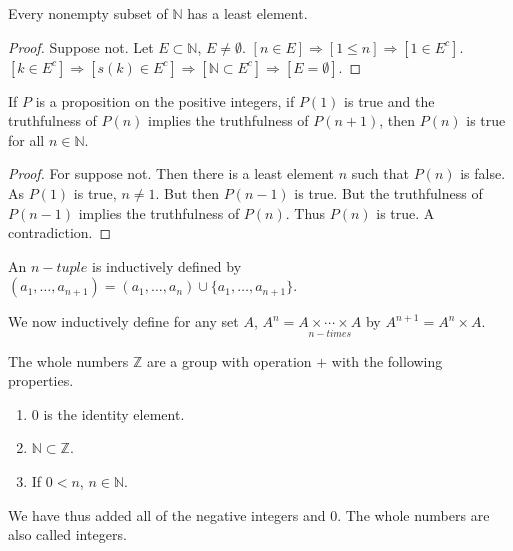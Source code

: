 \documentclass[crop=false,class=book,oneside]{standalone}
\begin{document}
            \begin{theorem}
            Every nonempty subset of $\mathbb{N}$ has a least element.
            \end{theorem}
            \begin{proof}
            Suppose not. Let $E\subset \mathbb{N}$, $E\ne\emptyset$. $[n\in E]\Rightarrow [1\leq n]\Rightarrow [1\in E^c]$. $[k\in E^c]\Rightarrow [s(k)\in E^c]\Rightarrow [\mathbb{N} \subset E^c]\Rightarrow [E = \emptyset]$.
            \end{proof}
            \begin{theorem}
            If $P$ is a proposition on the positive integers, if $P(1)$ is true and the truthfulness of $P(n)$ implies the truthfulness of $P(n+1)$, then $P(n)$ is true for all $n\in \mathbb{N}$.
            \end{theorem}
            \begin{proof}
            For suppose not. Then there is a least element $n$ such that $P(n)$ is false. As $P(1)$ is true, $n\ne 1$. But then $P(n-1)$ is true. But the truthfulness of $P(n-1)$ implies the truthfulness of $P(n)$. Thus $P(n)$ is true. A contradiction.
            \end{proof}
            \begin{definition}
            An $n-tuple$ is inductively defined by $(a_1,\hdots,a_{n+1}) = (a_1,\hdots, a_n)\cup \{a_1,\hdots,a_{n+1}\}$.
            \end{definition}
            \begin{definition}
            We now inductively define for any set $A$, $A^{n} = \underset{n-times}{A\times \cdots \times A}$ by $A^{n+1} = A^n \times A$.
            \end{definition}
            \begin{definition}
            The whole numbers $\mathbb{Z}$ are a group with operation $+$ with the following properties.
            \begin{enumerate}
            \item $0$ is the identity element.
            \item $\mathbb{N}\subset \mathbb{Z}$.
            \item If $0<n$, $n\in \mathbb{N}$.
            \end{enumerate}
            \end{definition}
            \begin{remark}
            We have thus added all of the negative integers and $0$. The whole numbers are also called integers.
            \end{remark}
\end{document}
